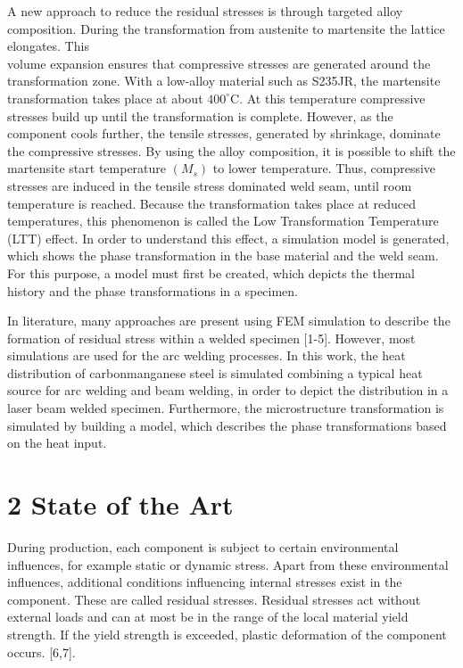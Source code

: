 \documentclass[10pt]{article}
\begin{document}
A new approach to reduce the residual stresses is through targeted alloy composition. During the transformation from austenite to martensite the lattice elongates. This\\
volume expansion ensures that compressive stresses are generated around the transformation zone. With a low-alloy material such as S235JR, the martensite transformation takes place at about $400^{\circ} \mathrm{C}$. At this temperature compressive stresses build up until the transformation is complete. However, as the component cools further, the tensile stresses, generated by shrinkage, dominate the compressive stresses. By using the alloy composition, it is possible to shift the martensite start temperature $\left(M_{s}\right)$ to lower temperature. Thus, compressive stresses are induced in the tensile stress dominated weld seam, until room temperature is reached. Because the transformation takes place at reduced temperatures, this phenomenon is called the Low Transformation Temperature (LTT) effect. In order to understand this effect, a simulation model is generated, which shows the phase transformation in the base material and the weld seam. For this purpose, a model must first be created, which depicts the thermal history and the phase transformations in a specimen.

In literature, many approaches are present using FEM simulation to describe the formation of residual stress within a welded specimen [1-5]. However, most simulations are used for the arc welding processes. In this work, the heat distribution of carbonmanganese steel is simulated combining a typical heat source for arc welding and beam welding, in order to depict the distribution in a laser beam welded specimen. Furthermore, the microstructure transformation is simulated by building a model, which describes the phase transformations based on the heat input.

\section*{2 State of the Art}
During production, each component is subject to certain environmental influences, for example static or dynamic stress. Apart from these environmental influences, additional conditions influencing internal stresses exist in the component. These are called residual stresses. Residual stresses act without external loads and can at most be in the range of the local material yield strength. If the yield strength is exceeded, plastic deformation of the component occurs. [6,7].
\end{document}
